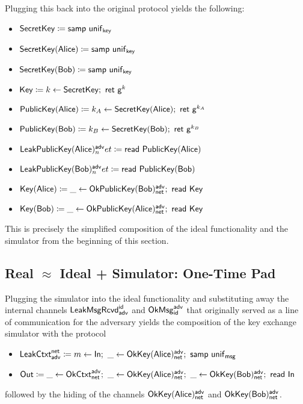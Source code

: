 \noindent Plugging this back into the original protocol yields the following:

\begin{itemize}
\item $\mathsf{SecretKey} \coloneqq \mathsf{samp} \ \mathsf{unif}_{\mathsf{key}}$
\item $\mathsf{SecretKey}(\mathsf{Alice}) \coloneqq \mathsf{samp} \ \mathsf{unif}_{\mathsf{key}}$
\item $\mathsf{SecretKey}(\mathsf{Bob}) \coloneqq \mathsf{samp} \ \mathsf{unif}_{\mathsf{key}}$
\item $\mathsf{Key} \coloneqq k \leftarrow \mathsf{SecretKey}; \ \mathsf{ret} \ \mathsf{g}^k$
\item $\mathsf{PublicKey}(\mathsf{Alice}) \coloneqq k_A \leftarrow \mathsf{SecretKey}(\mathsf{Alice}); \ \mathsf{ret} \ \mathsf{g}^{k_A}$
\item $\mathsf{PublicKey}(\mathsf{Bob}) \coloneqq k_B \leftarrow \mathsf{SecretKey}(\mathsf{Bob}); \ \mathsf{ret} \ \mathsf{g}^{k_B}$
\item $\mathsf{LeakPublicKey}(\mathsf{Alice})^{\mathsf{adv}}_net \coloneqq \mathsf{read} \ \mathsf{PublicKey}(\mathsf{Alice})$
\item $\mathsf{LeakPublicKey}(\mathsf{Bob})^{\mathsf{adv}}_net \coloneqq \mathsf{read} \ \mathsf{PublicKey}(\mathsf{Bob})$
\item $\mathsf{Key}(\mathsf{Alice}) \coloneqq \_ \leftarrow \mathsf{OkPublicKey}(\mathsf{Bob})^{\mathsf{adv}}_{\mathsf{net}}; \ \mathsf{read} \ \mathsf{Key}$
\item $\mathsf{Key}(\mathsf{Bob}) \coloneqq \_ \leftarrow \mathsf{OkPublicKey}(\mathsf{Alice})^{\mathsf{adv}}_{\mathsf{net}}; \ \mathsf{read} \ \mathsf{Key}$
\end{itemize}

\noindent This is precisely the simplified composition of the ideal functionality and the simulator from the beginning of this section.

\subsection{Real \texorpdfstring{$\approx$}{Approximates} Ideal + Simulator: One-Time Pad}
Plugging the simulator into the ideal functionality and substituting away the internal channels $\mathsf{LeakMsgRcvd}^{\mathsf{id}}_{\mathsf{adv}}$ and $\mathsf{OkMsg}^{\mathsf{adv}}_{\mathsf{id}}$ that originally served as a line of communication for the adversary yields the composition of the key exchange simulator with the protocol
\begin{itemize}
\item $\LeakCtxt^\net_\adv \coloneqq m \leftarrow \In; \ \_ \leftarrow \OkKey(\Alice)^\adv_\net; \ \samp{\unif_\msg}$
\item $\mathsf{Out} \coloneqq \_ \leftarrow \mathsf{OkCtxt}^{\mathsf{adv}}_{\mathsf{net}}; \ \_ \leftarrow \mathsf{OkKey}(\mathsf{Alice})^{\mathsf{adv}}_{\mathsf{net}}; \ \_ \leftarrow \mathsf{OkKey}(\mathsf{Bob})^{\mathsf{adv}}_{\mathsf{net}}; \  \mathsf{read} \ \mathsf{In}$
\end{itemize}
followed by the hiding of the channels $\mathsf{OkKey}(\mathsf{Alice})^{\mathsf{adv}}_{\mathsf{net}}$ and $\mathsf{OkKey}(\mathsf{Bob})^{\mathsf{adv}}_{\mathsf{net}}$.

